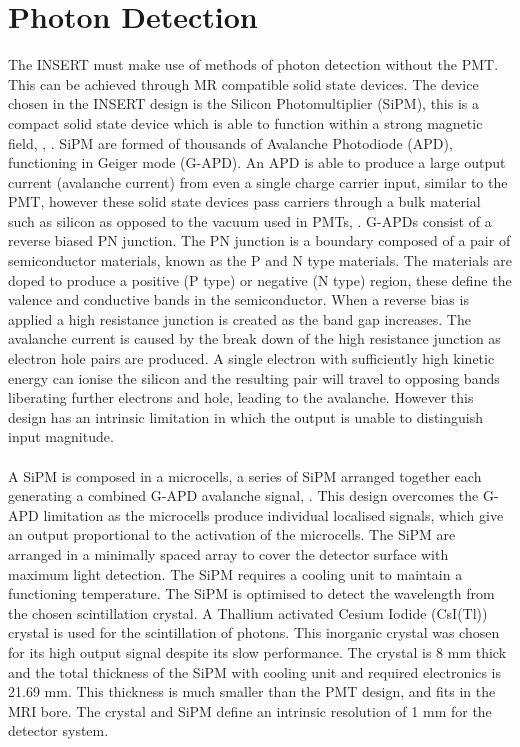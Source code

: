 \section{Photon Detection}
The INSERT must make use of methods of photon detection without the PMT. This can be achieved through MR compatible solid state devices. The device chosen in the INSERT design is the Silicon Photomultiplier (SiPM), this is a compact solid state device which is able to function within a strong magnetic field, \cite{SCHAART201631}, \cite{0031-9155-56-23-014}. SiPM are formed of thousands of Avalanche Photodiode (APD), functioning in Geiger mode (G-APD). An APD is able to produce a large output current (avalanche current) from even a single charge carrier input, similar to the PMT, however these solid state devices pass carriers through a bulk material such as silicon as opposed to the vacuum used in PMTs, \cite{RENKER200648}. G-APDs consist of a reverse biased PN junction. The PN junction is a boundary composed of a pair of semiconductor materials, known as the P and N type materials. The materials are doped to produce a positive (P type) or negative (N type) region, these define the valence and conductive bands in the semiconductor. When a reverse bias is applied a high resistance junction is created as the band gap increases. The avalanche current is caused by the break down of the high resistance junction as electron hole pairs are produced. A single electron with sufficiently high kinetic energy can ionise the silicon and the resulting pair will travel to opposing bands liberating further electrons and hole, leading to the avalanche. However this design has an intrinsic limitation in which the output is unable to distinguish input magnitude.
\paragraph{}
A SiPM is composed in a microcells, a series of SiPM arranged together each generating a combined G-APD avalanche signal, \cite{DINU2015367}. This design overcomes the G-APD limitation as the microcells produce individual localised signals, which give an output proportional to the activation of the microcells. The SiPM are arranged in a minimally spaced array to cover the detector surface with maximum light detection. The SiPM requires a cooling unit to maintain a functioning temperature. The SiPM is optimised to detect the wavelength from the chosen scintillation crystal. A Thallium activated Cesium Iodide (CsI(Tl)) crystal is used for the scintillation of photons. This inorganic crystal was chosen for its high output signal despite its slow performance. The crystal is 8 mm thick and the total thickness of the SiPM with cooling unit and required electronics is 21.69 mm. This thickness is much smaller than the PMT design, and fits in the MRI bore. The crystal and SiPM define an intrinsic resolution of 1 mm for the detector system.
